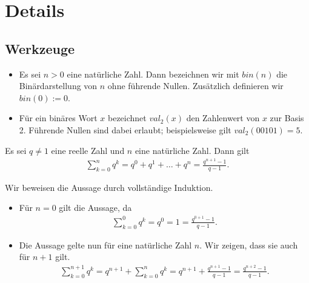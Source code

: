 \chapter{Details}\label{ch:Details}

\section{Werkzeuge}\label{sec:Werkzeuge}
\begin{mydefinition}\label{mydefinition:binunddec}
\leavevmode
\begin{itemize}
	\item Es sei $n>0$ eine natürliche Zahl. Dann bezeichnen wir mit $bin(n)$ die Binärdarstellung von $n$ ohne führende Nullen. Zusätzlich definieren wir $bin(0):=0$.
	\item Für ein binäres Wort $x$ bezeichnet $val_2(x)$ den Zahlenwert von $x$ zur Basis 2. Führende Nullen sind dabei erlaubt; beispielsweise gilt $val_2(00101)=5$.
\end{itemize}
\end{mydefinition}


\begin{mytheorem}\label{mytheorem:geometrischeSumme}
	Es sei $q \neq 1$ eine reelle Zahl und $n$ eine natürliche Zahl. Dann gilt
	\begin{align*}
		\sum_{k = 0}^n q^k = q^0 + q^1 + \ldots + q^n = \frac{q^{n+1}-1}{q-1}.
	\end{align*}
	\begin{myproof}
		Wir beweisen die Aussage durch vollständige Induktion.
		\begin{itemize}
			\item Für $n = 0$ gilt die Aussage, da
			      \begin{align*}
				      \sum_{k = 0}^0 q^k = q^0 = 1 = \frac{q^{0+1}-1}{q-1}.
			      \end{align*}
			\item Die Aussage gelte nun für eine natürliche Zahl $n$. Wir zeigen, dass sie auch für $n+1$ gilt.
			      \begin{align*}
				      \sum_{k = 0}^{n+1} q^k = q^{n+1} + \sum_{k = 0}^n q^k = q^{n+1} + \frac{q^{n+1}-1}{q-1} = \frac{q^{n+2}-1}{q-1}.
			      \end{align*}
		\end{itemize}
	\end{myproof}
\end{mytheorem}


